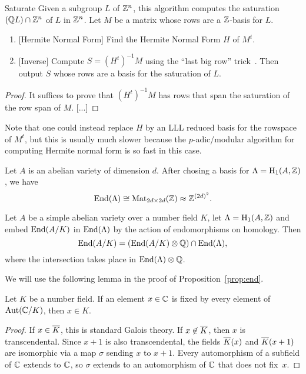\documentclass{article}
\begin{document}
\begin{algorithm}{Saturate}
	Given a subgroup $L$ of $\mathbb{Z}^n$, this algorithm computes
	the saturation $(\mathbb{Q} L) \cap \mathbb{Z}^n$ of $L$ in $\mathbb{Z}^n$.
	Let $M$ be a matrix whose rows are a $\mathbb{Z}$-basis for $L$.

	\begin{enumerate}
		\item{} [Hermite Normal Form] Find the Hermite Normal Form $H$ of $M^t$.
		\item{} [Inverse] Compute $S = (H^t)^{-1} M$ using the ``last big row''
		      trick~\cite{pernet-stein:hnf}.
		      Then output $S$ whose rows are a basis for the saturation of $L$.
	\end{enumerate}
\end{algorithm}
\begin{proof}
	It suffices to prove that $(H^t)^{-1}M$ has rows that span the
	saturation of the row span of $M$.
		[...]
\end{proof}

Note that one could instead replace $H$ by an LLL reduced basis for
the rowspace of $M^t$, but this is usually much slower because the
$p$-adic/modular algorithm \cite{blah} for computing Hermite normal
form is so fast in this case.


Let $A$ is an abelian variety of dimension $d$. After chosing a basis for
$\Lambda = \operatorname{H}_1(A,\mathbb{Z})$, we have
$$
	\operatorname{End}(\Lambda)\cong \operatorname{Mat}_{2d\times 2d}(\mathbb{Z}) \approx \mathbb{Z}^{(2d)^2}.
$$

\begin{proposition}\label{prop:end}
	Let $A$ be a simple abelian variety over a number field $K$,
	let $\Lambda = \operatorname{H}_1(A,\mathbb{Z})$ and
	embed $\operatorname{End}(A/K)$ in $\operatorname{End}(\Lambda)$
	by the action of endomorphisms on homology.   Then
	$$
		\operatorname{End}(A/K) = (\operatorname{End}(A/K)\otimes \mathbb{Q})\cap \operatorname{End}(\Lambda),
	$$
	where  the intersection takes place in $\operatorname{End}(\Lambda)\otimes\mathbb{Q}$.
\end{proposition}
We will use the following lemma in the proof of Proposition~\ref{prop:end}.
\begin{lemma}\label{lem:gal}
	Let $K$ be a number field.  If an element $x\in \mathbb{C}$ is fixed by
	every element of $\operatorname{Aut}(\mathbb{C}/K)$, then $x\in K$.
\end{lemma}
\begin{proof}
	If $x\in\overline{K}$, this is standard Galois theory.  If $x\not\in
		\overline{K}$, then $x$ is transcendental.  Since $x+1$ is also transcendental,
	the fields $\overline{K}(x)$ and $\overline{K}(x+1)$ are isomorphic via a map $\sigma$
	sending $x$ to $x+1$.  Every automorphism of a subfield of $\mathbb{C}$
	extends to $\mathbb{C}$, so $\sigma$ extends to an automorphism of $\mathbb{C}$
	that does not fix~$x$.
\end{proof}
\end{document}
